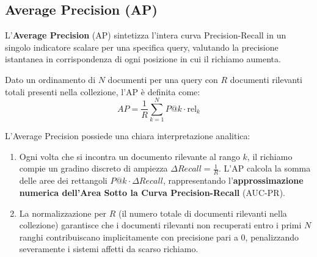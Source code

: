 \subsection{Average Precision (AP)}
L'\textbf{Average Precision} (AP) sintetizza l'intera curva Precision-Recall in un singolo indicatore scalare per una specifica query, valutando la precisione istantanea in corrispondenza di ogni posizione in cui il richiamo aumenta.

\begin{definition}
Dato un ordinamento di $N$ documenti per una query con $R$ documenti rilevanti totali presenti nella collezione, l'AP è definita come:
\begin{equation}
AP = \frac{1}{R} \sum_{k=1}^N P@k \cdot \mathrm{rel}_k
\end{equation}
\end{definition}

\begin{property}
L'Average Precision possiede una chiara interpretazione analitica:
\begin{enumerate}
    \item Ogni volta che si incontra un documento rilevante al rango $k$, il richiamo compie un gradino discreto di ampiezza $\Delta Recall = \frac{1}{R}$. L'AP calcola la somma delle aree dei rettangoli $P@k \cdot \Delta Recall$, rappresentando l'\textbf{approssimazione numerica dell'Area Sotto la Curva Precision-Recall} (AUC-PR).
    \item La normalizzazione per $R$ (il numero totale di documenti rilevanti nella collezione) garantisce che i documenti rilevanti non recuperati entro i primi $N$ ranghi contribuiscano implicitamente con precisione pari a $0$, penalizzando severamente i sistemi affetti da scarso richiamo.
\end{enumerate}
\end{property}

